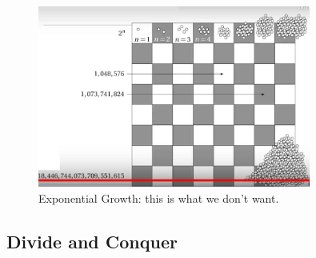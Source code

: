 \documentclass[]{article}
\begin{document}
\begin{figure}[H]
	\begin{center}
		\caption{Exponential Growth: this is what we don't want.}\label{fig:exponential}
		\includegraphics[width=0.8\textwidth]{exponential}
	\end{center}
\end{figure}
\subsection{Divide and Conquer}
\end{document}
